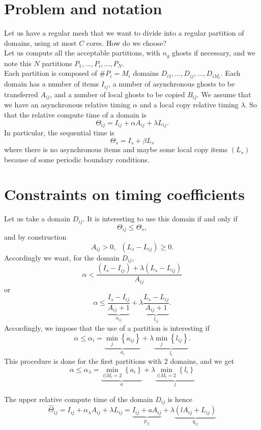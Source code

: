 \documentclass[aps,onecolumn,11pt]{revtex4}
\begin{document}
\section{Problem and notation}
Let us have a regular mesh that we want to divide into a regular partition of domains, using at most $C$ cores.
How do we choose?\\
Let us compute all the acceptable partitions, with $n_g$ ghosts if necessary, and we note this $N$ partitions 
$P_1,\ldots,P_i,\ldots,P_N$.\\
Each partition is composed of $\#P_i=M_i$ domains $D_{i1},\ldots,D_{ij},\ldots,D_{iM_i}$.
Each domain has a number of items $I_{ij}$, a number of asynchronous ghosts to be transferred $A_{ij}$, 
and a number of local ghosts to be copied $B_{ij}$. We assume that we have an asynchronous relative
timing $\alpha$ and a local copy relative timing $\lambda$.
So that the relative compute time of a domain is
$$
	\Theta_{ij} = I_{ij} + \alpha A_{ij} + \lambda L_{ij}.
$$
In particular, the sequential time is
$$
	\Theta_{s} = I_s + \beta L_s
$$
where there is no asynchronous items and maybe some local copy items $(L_s)$ because of some periodic boundary conditions.


\section{Constraints on timing coefficients}
Let us take a domain $D_{ij}$. It is interesting to use this domain if and only if
$$
	\Theta_{ij} \leq \Theta_s,
$$
and by construction
$$
	A_{ij}>0, \;\; \left(L_s-L_{ij}\right) \geq 0.
$$
Accordingly we want, for the domain $D_{ij}$,
$$
\alpha < \dfrac{\left(I_s-I_{ij}\right) + \lambda \left(L_s-L_{ij}\right)}{A_{ij}}
$$
or
$$
	\alpha \leq \underbrace{\dfrac{I_s-I_{ij}}{A_{ij}+1}}_{a_{ij}} + \lambda 
	\underbrace{\dfrac{L_s-L_{ij}}{A_{ij}+1}}_{l_{ij}}.
$$
Accordingly, we impose that the use of a partition is interesting if
$$
\alpha \leq \alpha_{i} = \underbrace{\min_{j}\left\lbrace a_{ij}\right\rbrace}_{a_i} + \lambda \underbrace{\min_{j}\left\lbrace l_{ij}\right\rbrace}_{l_i}.
$$
This procedure is done for the first partitions with 2 domains, and we get
$$
	\alpha \leq \alpha_\lambda = \underbrace{\min_{i|M_i=2}\left\lbrace a_i\right\rbrace}_{a} 
	+ \lambda \underbrace{\min_{i|M_i=2}\left\lbrace l_i\right\rbrace}_{l} 
$$

The upper relative compute time of the domain $D_{ij}$ is hence 
$$
	\hat\Theta_{ij} = I_{ij} + \alpha_\lambda A_{ij} + \lambda L_{ij}
	= \underbrace{I_{ij} + a A_{ij}}_{p_{ij}} + \lambda \underbrace{\left( l A_{ij} + L_{ij} \right)}_{q_{ij}}
$$
\end{document}
